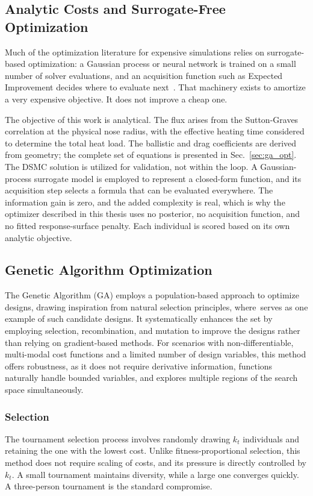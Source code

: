 \subsection{Analytic Costs and Surrogate-Free Optimization}

Much of the optimization literature for expensive simulations relies on surrogate-based optimization: a Gaussian process or neural network is trained on a small number of solver evaluations, and an acquisition function such as Expected Improvement decides where to evaluate next~\cite{rasmussen2003}. That machinery exists to amortize a very expensive objective. It does not improve a cheap one.

The objective of this work is analytical. The flux arises from the Sutton-Graves correlation at the physical nose radius, with the effective heating time considered to determine the total heat load. The ballistic and drag coefficients are derived from geometry; the complete set of equations is presented in Sec.~\ref{sec:ga_opt}. The DSMC solution is utilized for validation, not within the loop. A Gaussian-process surrogate model is employed to represent a closed-form function, and its acquisition step selects a formula that can be evaluated everywhere. The information gain is zero, and the added complexity is real, which is why the optimizer described in this thesis uses no posterior, no acquisition function, and no fitted response-surface penalty. Each individual is scored based on its own analytic objective.

\subsection{Genetic Algorithm Optimization}

The Genetic Algorithm (GA) employs a population-based approach to optimize designs, drawing inspiration from natural selection principles, where~\cite{Goldberg1989}serves as one example of such candidate designs. It systematically enhances the set by employing selection, recombination, and mutation to improve the designs rather than relying on gradient-based methods. For scenarios with non-differentiable, multi-modal cost functions and a limited number of design variables, this method offers robustness, as it does not require derivative information, functions naturally handle bounded variables, and explores multiple regions of the search space simultaneously.

\subsubsection{Selection}
The tournament selection process involves randomly drawing $k_t$ individuals and retaining the one with the lowest cost. Unlike fitness-proportional selection, this method does not require scaling of costs, and its pressure is directly controlled by $k_t$. A small tournament maintains diversity, while a large one converges quickly. A three-person tournament is the standard compromise.

